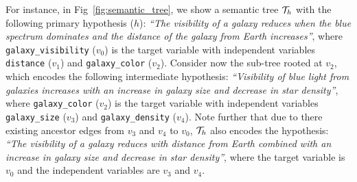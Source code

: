For instance, in Fig~\ref{fig:semantic_tree}, we show a semantic tree $\mathcal{T}_h$ with the following primary hypothesis ($h$): \textit{``The visibility of a galaxy reduces when the blue spectrum dominates and the distance of the galaxy from Earth increases''}, where \texttt{galaxy\_visibility} ($v_0$) is the target variable with independent variables \texttt{distance} ($v_1$) and \texttt{galaxy\_color} ($v_2$). Consider now the sub-tree rooted at $v_2$, which encodes the following intermediate hypothesis: \textit{``Visibility of blue light from galaxies increases with an increase in galaxy size and decrease in star density''}, where \texttt{galaxy\_color} ($v_2$) is the target variable with independent variables \texttt{galaxy\_size} ($v_3$) and \texttt{galaxy\_density} ($v_4$). Note further that due to there existing ancestor edges from $v_3$ and $v_4$ to $v_0$, $\mathcal{T}_h$ also encodes the hypothesis: \textit{``The visibility of a galaxy reduces with distance from Earth combined with an increase in galaxy size and decrease in star density''}, where the target variable is $v_0$ and the independent variables are $v_3$ and $v_4$.


